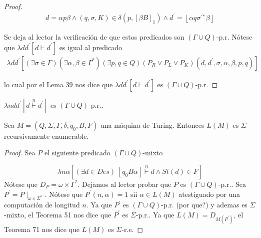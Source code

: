 \begin{lemma}
\begin{proof}
    \begin{eqnarray}
      \nonumber d=\alpha p\beta \wedge (q,\sigma ,K)\in \delta \left( p,\left[ \beta B\right] _{1}\right) \wedge
                d^{\prime }=\left\lfloor \alpha q\sigma ^{\curvearrowright }\beta \right\rfloor
    \end{eqnarray}

    Se deja al lector la verificación de que estos predicados son $(\Gamma \cup Q)$-p.r.
    Nótese que $\lambda dd^{\prime }\left[ d\vdash d^{\prime }\right] $ es igual al predicado
    \begin{eqnarray}
      \nonumber \lambda dd^{\prime }\left[ (\exists \sigma \in \Gamma )(\exists \alpha ,\beta \in \Gamma ^{\ast })
                (\exists p,q\in Q)(P_{R}\vee P_{L}\vee P_{K})(d,d^{\prime },\sigma ,\alpha ,\beta ,p,q)\right]
    \end{eqnarray}

    lo cual por el Lema 39 nos dice que $\lambda dd^{\prime } \left[ d\vdash d^{\prime }\right] $ es
    $(\Gamma \cup Q)$-p.r.

  \end{proof}

  \end{lemma}

	\begin{proposition}
		$\lambda ndd^{\prime }\left[ d\overset{n}{\vdash }d^{\prime }\right] $ es $ (\Gamma \cup Q)$-p.r..
	\end{proposition}


  \begin{theorem}
  	Sea $M=\left( Q,\Sigma ,\Gamma ,\delta ,q_{0},B,F\right) $ una máquina de Turing.
    Entonces $L(M)$ es $\Sigma $-recursivamente enumerable.

  \begin{proof}
     Sea $P$ el siguiente predicado $(\Gamma \cup Q)$-mixto

    \[
      \lambda n\alpha \left[ (\exists d\in Des)\;\left\lfloor q_{0}B\alpha \right\rfloor \overset{n}{\vdash }d\wedge
        St(d)\in F\right]
    \]
    Nótese que $D_{P}=\omega \times \Gamma ^{\ast }$. Dejamos al lector probar que $P$ es $(\Gamma \cup Q)$-p.r..
    Sea $P^{\prime }=P\mid _{\omega \times \Sigma ^{\ast }}$. Nótese que $P^{\prime }(n,\alpha )=1$ sii
    $\alpha \in L(M) $ atestiguado por una computación de longitud $n$. Ya que $P^{\prime }$ es $(\Gamma \cup Q)$-p.r.
    (por que?) y ademas es $\Sigma $-mixto, el Teorema 51 nos dice que $P^{\prime }$ es $\Sigma $-p.r..
    Ya que $ L(M)=D_{M(P^{\prime })}$, el Teorema 71 nos dice que $ L(M)$ es $\Sigma $-r.e.
  \end{proof}
  \end{theorem}

